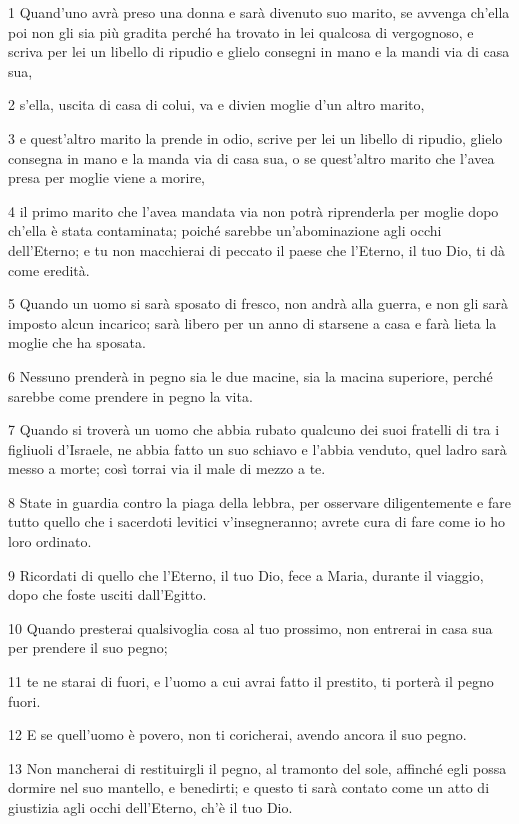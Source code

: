 \par 1 Quand'uno avrà preso una donna e sarà divenuto suo marito, se avvenga ch'ella poi non gli sia più gradita perché ha trovato in lei qualcosa di vergognoso, e scriva per lei un libello di ripudio e glielo consegni in mano e la mandi via di casa sua,
\par 2 s'ella, uscita di casa di colui, va e divien moglie d'un altro marito,
\par 3 e quest'altro marito la prende in odio, scrive per lei un libello di ripudio, glielo consegna in mano e la manda via di casa sua, o se quest'altro marito che l'avea presa per moglie viene a morire,
\par 4 il primo marito che l'avea mandata via non potrà riprenderla per moglie dopo ch'ella è stata contaminata; poiché sarebbe un'abominazione agli occhi dell'Eterno; e tu non macchierai di peccato il paese che l'Eterno, il tuo Dio, ti dà come eredità.
\par 5 Quando un uomo si sarà sposato di fresco, non andrà alla guerra, e non gli sarà imposto alcun incarico; sarà libero per un anno di starsene a casa e farà lieta la moglie che ha sposata.
\par 6 Nessuno prenderà in pegno sia le due macine, sia la macina superiore, perché sarebbe come prendere in pegno la vita.
\par 7 Quando si troverà un uomo che abbia rubato qualcuno dei suoi fratelli di tra i figliuoli d'Israele, ne abbia fatto un suo schiavo e l'abbia venduto, quel ladro sarà messo a morte; così torrai via il male di mezzo a te.
\par 8 State in guardia contro la piaga della lebbra, per osservare diligentemente e fare tutto quello che i sacerdoti levitici v'insegneranno; avrete cura di fare come io ho loro ordinato.
\par 9 Ricordati di quello che l'Eterno, il tuo Dio, fece a Maria, durante il viaggio, dopo che foste usciti dall'Egitto.
\par 10 Quando presterai qualsivoglia cosa al tuo prossimo, non entrerai in casa sua per prendere il suo pegno;
\par 11 te ne starai di fuori, e l'uomo a cui avrai fatto il prestito, ti porterà il pegno fuori.
\par 12 E se quell'uomo è povero, non ti coricherai, avendo ancora il suo pegno.
\par 13 Non mancherai di restituirgli il pegno, al tramonto del sole, affinché egli possa dormire nel suo mantello, e benedirti; e questo ti sarà contato come un atto di giustizia agli occhi dell'Eterno, ch'è il tuo Dio.
